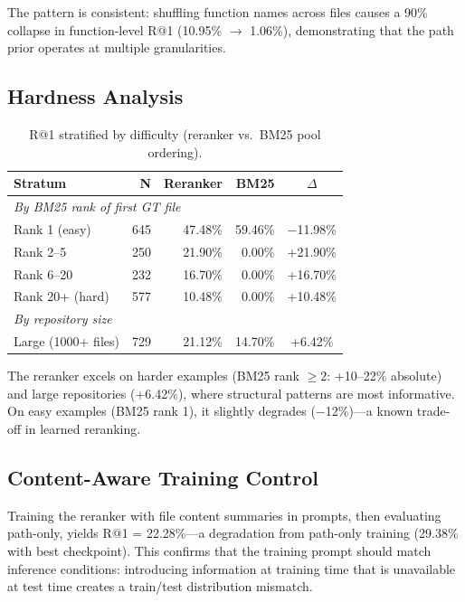 \documentclass{article}
\begin{document}
The pattern is consistent: shuffling function names across files causes a 90\% collapse in function-level R@1 (10.95\% $\to$ 1.06\%), demonstrating that the path prior operates at multiple granularities.


\subsection{Hardness Analysis}
\label{app:hardness}

\begin{table}[h]
\centering
\caption{R@1 stratified by difficulty (reranker vs.\ BM25 pool ordering).}
\label{tab:hardness}
\small
\begin{tabular}{lrrrc}
\toprule
\textbf{Stratum} & \textbf{N} & \textbf{Reranker} & \textbf{BM25} & \textbf{$\Delta$} \\
\midrule
\multicolumn{5}{l}{\emph{By BM25 rank of first GT file}} \\
\quad Rank 1 (easy) & 645 & 47.48\% & 59.46\% & $-$11.98\% \\
\quad Rank 2--5 & 250 & 21.90\% & 0.00\% & +21.90\% \\
\quad Rank 6--20 & 232 & 16.70\% & 0.00\% & +16.70\% \\
\quad Rank 20+ (hard) & 577 & 10.48\% & 0.00\% & +10.48\% \\
\midrule
\multicolumn{5}{l}{\emph{By repository size}} \\
\quad Large (1000+ files) & 729 & 21.12\% & 14.70\% & +6.42\% \\
\bottomrule
\end{tabular}
\end{table}

The reranker excels on harder examples (BM25 rank $\geq 2$: +10--22\% absolute) and large repositories (+6.42\%), where structural patterns are most informative.
On easy examples (BM25 rank 1), it slightly degrades ($-$12\%)---a known trade-off in learned reranking.


\subsection{Content-Aware Training Control}
\label{app:content_control}

Training the reranker with file content summaries in prompts, then evaluating path-only, yields R@1 = 22.28\%---a degradation from path-only training (29.38\% with best checkpoint).
This confirms that the training prompt should match inference conditions: introducing information at training time that is unavailable at test time creates a train/test distribution mismatch.
\end{document}
